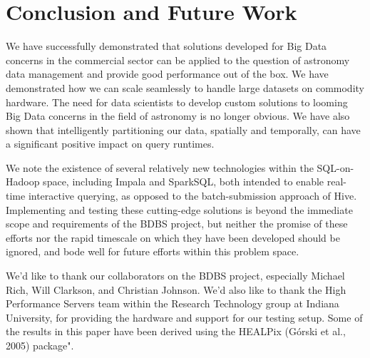 \documentclass[11pt,twoside]{article}
\begin{document}

\section{Conclusion and Future Work}

We have successfully demonstrated that solutions developed for Big Data concerns in the commercial sector can be applied to the question of astronomy data management and provide good performance out of the box.  We have demonstrated how we can scale seamlessly to handle large datasets on commodity hardware.  The need for data scientists to develop custom solutions to looming Big Data concerns in the field of astronomy is no longer obvious.  We have also shown that intelligently partitioning our data, spatially and temporally, can have a significant positive impact on query runtimes.  

We note the existence of several relatively new technologies within the SQL-on-Hadoop space, including Impala and SparkSQL, both intended to enable real-time interactive querying, as opposed to the batch-submission approach of Hive.  Implementing and testing these cutting-edge solutions is beyond the immediate scope and requirements of the BDBS project, but neither the promise of these efforts nor the rapid timescale on which they have been developed should be ignored, and bode well for future efforts within this problem space.  

\acknowledgements We'd like to thank our collaborators on the BDBS project, especially Michael Rich, Will Clarkson, and Christian Johnson.  We'd also like to thank the High Performance Servers team within the Research Technology group at Indiana University, for providing the hardware and support for our testing setup. Some of the results in this paper have been derived using the HEALPix (Górski et al., 2005) package".


\end{document}
